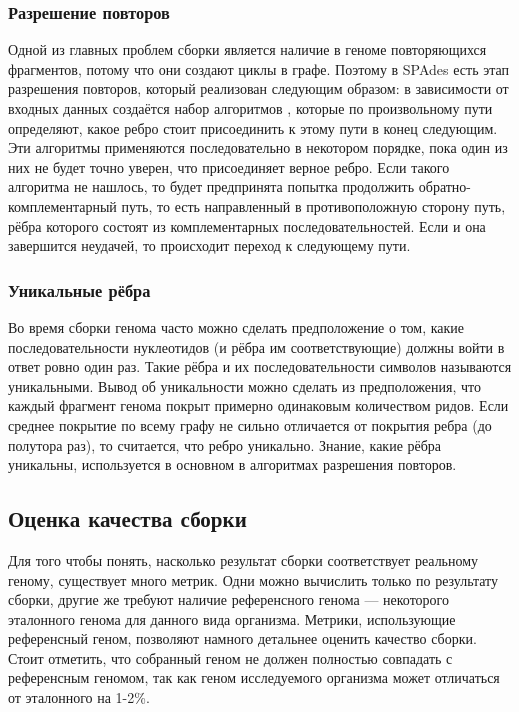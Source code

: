 \documentclass[14pt]{matmex-diploma-custom}
\begin{document}
\subsubsection{Разрешение повторов}

Одной из главных проблем сборки является наличие в геноме повторяющихся фрагментов, потому что они создают циклы в графе. Поэтому в SPAdes есть этап разрешения повторов, который реализован следующим образом: в зависимости от входных данных создаётся набор алгоритмов \cite{art:exspander, art:vasilinetc2015assembling, art:hybridspades}, которые по произвольному пути определяют, какое ребро стоит присоединить к этому пути в конец следующим. Эти алгоритмы применяются последовательно в некотором порядке, пока один из них не будет точно уверен, что присоединяет верное ребро. Если такого алгоритма не нашлось, то будет предпринята попытка продолжить обратно-комплементарный путь, то есть направленный в противоположную сторону путь, рёбра которого состоят из комплементарных последовательностей. Если и она завершится неудачей, то происходит переход к следующему пути.

\subsubsection{Уникальные рёбра}

Во время сборки генома часто можно сделать предположение о том, какие последовательности нуклеотидов (и рёбра им соответствующие) должны войти в ответ ровно один раз. Такие рёбра и их последовательности символов называются уникальными. Вывод об уникальности можно сделать из предположения, что каждый фрагмент генома покрыт примерно одинаковым количеством ридов. Если среднее покрытие по всему графу не сильно отличается от покрытия ребра (до полутора раз), то считается, что ребро уникально. Знание, какие рёбра уникальны, используется в основном в алгоритмах разрешения повторов.
\subsection{Оценка качества сборки}
Для того чтобы понять, насколько результат сборки соответствует реальному геному, существует много метрик. Одни можно вычислить только по результату сборки, другие же требуют наличие референсного генома --- некоторого эталонного генома для данного вида организма. Метрики, использующие референсный геном, позволяют намного детальнее оценить качество сборки. Стоит отметить, что собранный геном не должен полностью совпадать с референсным геномом, так как геном исследуемого организма может отличаться от эталонного на 1-2\%.
\end{document}
